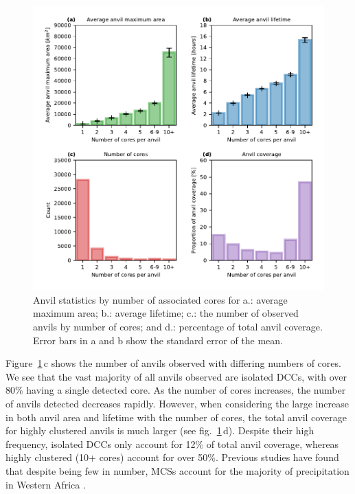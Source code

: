 \documentclass[acp, manuscript]{copernicus}
\begin{document}
\begin{figure}[tp]
    \includegraphics[width=12cm]{figures/fig06.pdf}
    \caption[
    Anvil statistics by number of associated cores for average maximum area, average lifetime, occurrence of anvils by number of cores, and percentage of total anvil coverage
    ]{
    Anvil statistics by number of associated cores for a.: average maximum area; b.: average lifetime; c.: the number of observed anvils by number of cores; and d.: percentage of total anvil coverage. Error bars in a and b show the standard error of the mean.
    }
    \label{fig:seviri_anvil_stats}
\end{figure}


Figure~\ref{fig:seviri_anvil_stats}\,c shows the number of anvils observed with differing numbers of cores. 
We see that the vast majority of all anvils observed are isolated DCCs, with over 80\% having a single detected core. 
As the number of cores increases, the number of anvils detected decreases rapidly. 
However, when considering the large increase in both anvil area and lifetime with the number of cores, the total anvil coverage for highly clustered anvils is much larger (see fig.~\ref{fig:seviri_anvil_stats}\,d). 
Despite their high frequency, isolated DCCs only account for 12\% of total anvil coverage, whereas highly clustered (10+ cores) account for over 50\%. 
Previous studies have found that despite being few in number, MCSs account for the majority of precipitation in Western Africa \citep{vizy_understanding_2019}.
\end{document}
